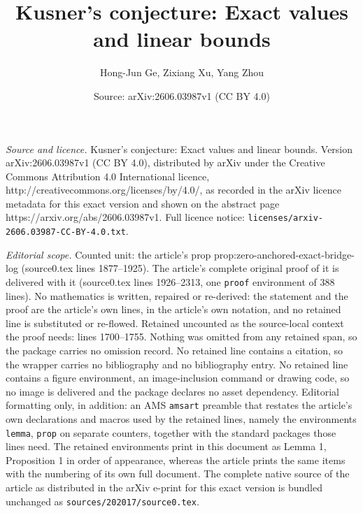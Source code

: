 \documentclass[10pt,a4paper]{amsart}
\title{Kusner's conjecture: Exact values and linear bounds}
\author{Hong-Jun Ge, Zixiang Xu, Yang Zhou}
\date{Source: arXiv:2606.03987v1 (CC BY 4.0)}
\begin{document}
\maketitle

\noindent\emph{Source and licence.} Kusner's conjecture: Exact values and linear bounds. Version arXiv:2606.03987v1 (CC BY 4.0), distributed by arXiv under the Creative Commons Attribution 4.0 International licence, http://creativecommons.org/licenses/by/4.0/, as recorded in the arXiv licence metadata for this exact version and shown on the abstract page https://arxiv.org/abs/2606.03987v1. Full licence notice: \texttt{licenses/arxiv-2606.03987-CC-BY-4.0.txt}.\par\smallskip

\noindent\textit{Editorial scope.} Counted unit: the article's prop prop:zero-anchored-exact-bridge-log (source0.tex lines 1877--1925). The article's complete original proof of it is delivered with it (source0.tex lines 1926--2313, one \texttt{proof} environment of 388 lines). No mathematics is written, repaired or re-derived: the statement and the proof are the article's own lines, in the article's own notation, and no retained line is substituted or re-flowed.  Retained uncounted as the source-local context the proof needs: lines 1700--1755.  Nothing was omitted from any retained span, so the package carries no omission record.  No retained line contains a citation, so the wrapper carries no bibliography and no bibliography entry.  No retained line contains a figure environment, an image-inclusion command or drawing code, so no image is delivered and the package declares no asset dependency.  Editorial formatting only, in addition: an AMS \texttt{amsart} preamble that restates the article's own declarations and macros used by the retained lines, namely the environments \texttt{lemma}, \texttt{prop} on separate counters, together with the standard packages those lines need.  The retained environments print in this document as Lemma 1, Proposition 1 in order of appearance, whereas the article prints the same items with the numbering of its own full document.  The complete native source of the article as distributed in the arXiv e-print for this exact version is bundled unchanged as \texttt{sources/202017/source0.tex}.
\end{document}
